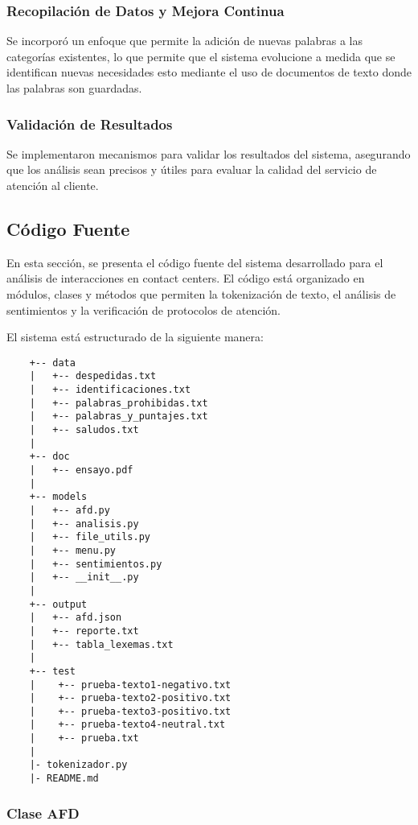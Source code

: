 \documentclass[12pt,a4paper]{article}
\begin{document}
\subsubsection{Recopilación de Datos y Mejora Continua}
Se incorporó un enfoque que permite la adición de nuevas palabras a las categorías existentes, lo que permite que el sistema evolucione a medida que se identifican nuevas necesidades esto mediante el uso de documentos de texto donde las palabras son guardadas.

\subsubsection{Validación de Resultados}
Se implementaron mecanismos para validar los resultados del sistema, asegurando que los análisis sean precisos y útiles para evaluar la calidad del servicio de atención al cliente.
\newpage
\subsection{Código Fuente}
En esta sección, se presenta el código fuente del sistema desarrollado para el análisis de interacciones en contact centers. El código está organizado en módulos, clases y métodos que permiten la tokenización de texto, el análisis de sentimientos y la verificación de protocolos de atención.

El sistema está estructurado de la siguiente manera:
\begin{verbatim}
    +-- data
    |   +-- despedidas.txt
    |   +-- identificaciones.txt
    |   +-- palabras_prohibidas.txt
    |   +-- palabras_y_puntajes.txt
    |   +-- saludos.txt
    |
    +-- doc
    |   +-- ensayo.pdf
    |
    +-- models
    |   +-- afd.py
    |   +-- analisis.py
    |   +-- file_utils.py
    |   +-- menu.py
    |   +-- sentimientos.py
    |   +-- __init__.py
    |
    +-- output
    |   +-- afd.json
    |   +-- reporte.txt
    |   +-- tabla_lexemas.txt
    |
    +-- test
    |    +-- prueba-texto1-negativo.txt
    |    +-- prueba-texto2-positivo.txt
    |    +-- prueba-texto3-positivo.txt
    |    +-- prueba-texto4-neutral.txt
    |    +-- prueba.txt
    |
    |- tokenizador.py
    |- README.md
\end{verbatim}

\newpage
\subsubsection{Clase AFD}
\end{document}
